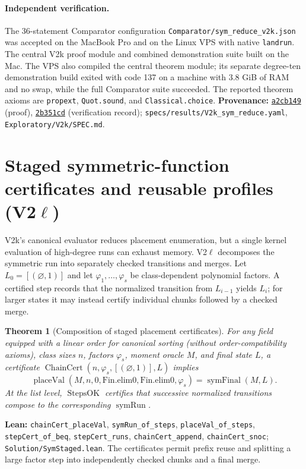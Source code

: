 \documentclass[11pt]{article}
\newtheorem{theorem}{Theorem}[section]
\newcommand{\code}[1]{\texttt{#1}}
\begin{document}
\paragraph{Independent verification.}
The 36-statement Comparator configuration
\nolinkurl{Comparator/sym_reduce_v2k.json} was accepted on the MacBook Pro
and on the Linux VPS with native \code{landrun}. The central V2k proof
module and combined demonstration suite built on the Mac. The VPS also
compiled the central theorem module; its separate degree-ten demonstration
build exited with code 137 on a machine with 3.8 GiB of RAM and no swap,
while the full Comparator suite succeeded. The reported theorem axioms are
\code{propext}, \code{Quot.sound}, and \code{Classical.choice}.
\noindent\textbf{Provenance:}
\href{https://github.com/thinkthoughts/lean-bgp212/commit/a2cb149}{\code{a2cb149}}
(proof),
\href{https://github.com/thinkthoughts/lean-bgp212/commit/2b351cd}{\code{2b351cd}}
(verification record); \nolinkurl{specs/results/V2k_sym_reduce.yaml},
\nolinkurl{Exploratory/V2k/SPEC.md}.


\section{Staged symmetric-function certificates and reusable profiles (V2\ensuremath{\ell})}\label{sec:v2l}
V2k's canonical evaluator reduces placement enumeration, but a single
kernel evaluation of high-degree runs can exhaust memory. V2\ensuremath{\ell}
decomposes the symmetric run into separately checked transitions and merges.
Let $L_0=[(\varnothing,1)]$ and let $\varphi_1,\ldots,\varphi_s$
be class-dependent polynomial factors. A certified step records that the
normalized transition from $L_{i-1}$ yields $L_i$; for larger states it may
instead certify individual chunks followed by a checked merge.

\begin{theorem}[Composition of staged placement certificates]\label{thm:v2l-chain}
For any field equipped with a linear order for canonical sorting (without
order-compatibility axioms), class sizes $n$, factors $\varphi_s$, moment oracle $M$,
and final state $L$, a certificate
$\operatorname{ChainCert}(n,\varphi_s,[ (\varnothing,1) ],L)$ implies
\[
\operatorname{placeVal}(M,n,0,\mathrm{Fin.elim0},\mathrm{Fin.elim0},\varphi_s)
=\operatorname{symFinal}(M,L).
\]
At the list level, $\operatorname{StepsOK}$ certifies that successive
normalized transitions compose to the corresponding $\operatorname{symRun}$.
\end{theorem}
\noindent\textbf{Lean:} \code{chainCert\_placeVal},
\code{symRun\_of\_steps}, \code{placeVal\_of\_steps},
\code{stepCert\_of\_beq}, \code{stepCert\_runs},
\code{chainCert\_append}, \code{chainCert\_snoc};
\nolinkurl{Solution/SymStaged.lean}.
The certificates permit prefix reuse and splitting a large factor step into
independently checked chunks and a final merge.
\end{document}
